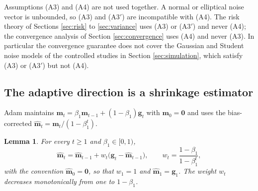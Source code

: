 \documentclass[pdflatex,sn-mathphys-num]{sn-jnl}%
\theoremstyle{thmstyleone}%
\theoremstyle{thmstyletwo}%
\newtheorem{lemma}{Lemma}%
\theoremstyle{thmstylethree}%
\newenvironment{revblock}{}{}
\begin{document}
Assumptions (A3) and (A4) are not used together. A normal or elliptical noise vector is unbounded, so (A3) and (A3$'$) are incompatible with (A4). The risk theory of Sections \ref{sec:risk} to \ref{sec:variance} uses (A3) or (A3$'$) and never (A4); the convergence analysis of Section \ref{sec:convergence} uses (A4) and never (A3). In particular the convergence guarantee does not cover the Gaussian and Student noise models of the controlled studies in Section \ref{sec:simulation}, which satisfy (A3) or (A3$'$) but not (A4).

\subsection{The adaptive direction is a shrinkage estimator}

Adam maintains $\bm m_t=\beta_1\bm m_{t-1}+(1-\beta_1)\bm g_t$ with $\bm m_0=\bm 0$ and uses the bias-corrected $\hat{\bm m}_t=\bm m_t/(1-\beta_1^{t})$.

\begin{lemma}
\label{lem:adam_identity}
For every $t\ge1$ and $\beta_1\in[0,1)$,
\begin{equation}
\hat{\bm m}_t=\hat{\bm m}_{t-1}+w_t\bigl(\bm g_t-\hat{\bm m}_{t-1}\bigr),
\qquad
w_t=\frac{1-\beta_1}{1-\beta_1^{t}},
\end{equation}
with the convention $\hat{\bm m}_0=\bm 0$, so that $w_1=1$ and $\hat{\bm m}_1=\bm g_1$. The weight $w_t$ decreases monotonically from one to $1-\beta_1$.
\end{lemma}
\end{document}
